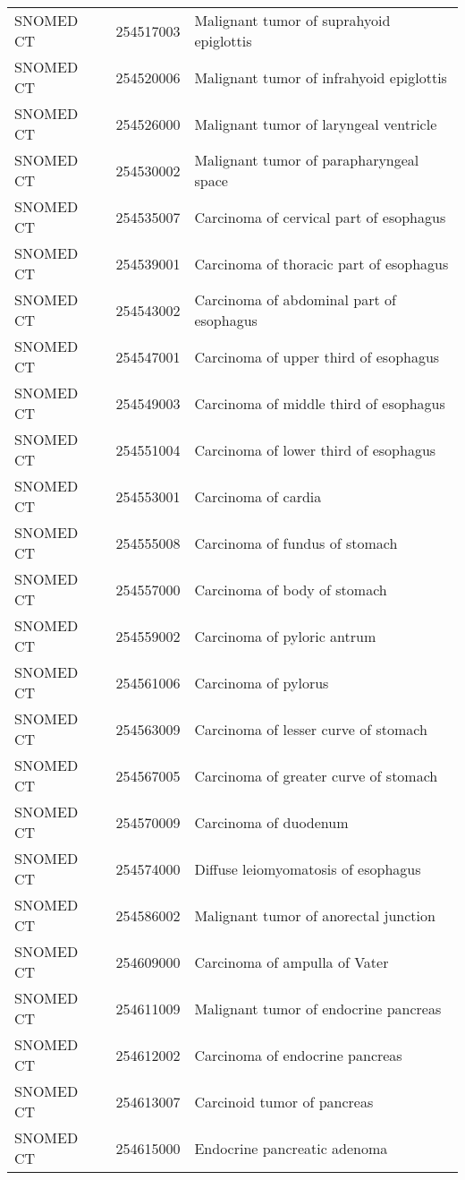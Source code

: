 \begin{longtable}{p{}p{}p{}}
  SNOMED CT & 254517003 & Malignant tumor of suprahyoid epiglottis \\ 
  SNOMED CT & 254520006 & Malignant tumor of infrahyoid epiglottis \\ 
  SNOMED CT & 254526000 & Malignant tumor of laryngeal ventricle \\ 
  SNOMED CT & 254530002 & Malignant tumor of parapharyngeal space \\ 
  SNOMED CT & 254535007 & Carcinoma of cervical part of esophagus \\ 
  SNOMED CT & 254539001 & Carcinoma of thoracic part of esophagus \\ 
  SNOMED CT & 254543002 & Carcinoma of abdominal part of esophagus \\ 
  SNOMED CT & 254547001 & Carcinoma of upper third of esophagus \\ 
  SNOMED CT & 254549003 & Carcinoma of middle third of esophagus \\ 
  SNOMED CT & 254551004 & Carcinoma of lower third of esophagus \\ 
  SNOMED CT & 254553001 & Carcinoma of cardia \\ 
  SNOMED CT & 254555008 & Carcinoma of fundus of stomach \\ 
  SNOMED CT & 254557000 & Carcinoma of body of stomach \\ 
  SNOMED CT & 254559002 & Carcinoma of pyloric antrum \\ 
  SNOMED CT & 254561006 & Carcinoma of pylorus \\ 
  SNOMED CT & 254563009 & Carcinoma of lesser curve of stomach \\ 
  SNOMED CT & 254567005 & Carcinoma of greater curve of stomach \\ 
  SNOMED CT & 254570009 & Carcinoma of duodenum \\ 
  SNOMED CT & 254574000 & Diffuse leiomyomatosis of esophagus \\ 
  SNOMED CT & 254586002 & Malignant tumor of anorectal junction \\ 
  SNOMED CT & 254609000 & Carcinoma of ampulla of Vater \\ 
  SNOMED CT & 254611009 & Malignant tumor of endocrine pancreas \\ 
  SNOMED CT & 254612002 & Carcinoma of endocrine pancreas \\ 
  SNOMED CT & 254613007 & Carcinoid tumor of pancreas \\ 
  SNOMED CT & 254615000 & Endocrine pancreatic adenoma \\ 

\end{longtable}

